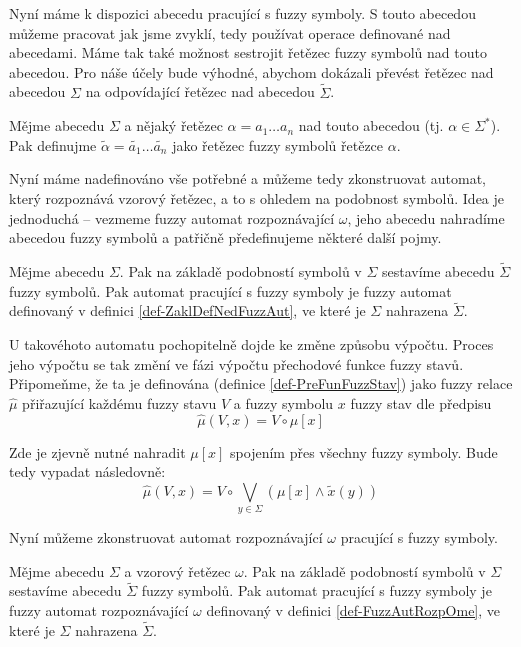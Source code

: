 \documentclass[a4paper,10pt]{article}
\begin{document}
Nyní máme k dispozici abecedu pracující s fuzzy symboly. S touto abecedou můžeme pracovat jak jsme zvyklí, tedy používat operace definované nad abecedami. Máme tak také možnost sestrojit řetězec fuzzy symbolů nad touto abecedou. Pro náše účely bude výhodné, abychom dokázali převést řetězec nad abecedou $\Sigma$ na odpovídající řetězec nad abecedou $\widetilde{\Sigma}$.

\begin{definition}
Mějme abecedu $\Sigma$ a nějaký řetězec $\alpha = a_1 \dots a_n$ nad touto abecedou (tj. $\alpha \in \Sigma^*$). Pak definujme $\widetilde{\alpha} = \widetilde{a_1} \dots \widetilde{a_n}$ jako řetězec fuzzy symbolů řetězce $\alpha$.
\end{definition}

Nyní máme nadefinováno vše potřebné a můžeme tedy zkonstruovat automat, který rozpoznává vzorový řetězec, a to s ohledem na podobnost symbolů. Idea je jednoduchá -- vezmeme fuzzy automat rozpoznávající $\omega$, jeho abecedu nahradíme abecedou fuzzy symbolů a patřičně předefinujeme některé další pojmy.

\begin{definition}
  Mějme abecedu $\Sigma$. Pak na základě podobností symbolů v $\Sigma$ sestavíme abecedu $\widetilde{\Sigma}$ fuzzy symbolů. Pak automat pracující s fuzzy symboly je fuzzy automat definovaný v definici \ref{def-ZaklDefNedFuzzAut}, ve které je $\Sigma$ nahrazena $\widetilde{\Sigma}$.
\end{definition}

U takovéhoto automatu pochopitelně dojde ke změne způsobu výpočtu. Proces jeho výpočtu se tak změní ve fázi výpočtu přechodové funkce fuzzy stavů. Připomeňme, že ta je definována (definice \ref{def-PreFunFuzzStav}) jako fuzzy relace $\widehat{\mu}$ přiřazující každému fuzzy stavu $V$ a fuzzy symbolu $x$ fuzzy stav dle předpisu
$$
 \widehat{\mu}(V, x) = V \circ \mu[x]
$$

Zde je zjevně nutné nahradit $\mu[x]$ spojením přes všechny fuzzy symboly. Bude tedy vypadat následovně:
$$
 \widehat{\mu}(V, x) = V \circ \bigvee_{y \in \Sigma} (\mu[x] \wedge \widetilde{x}(y))
$$

Nyní můžeme zkonstruovat automat rozpoznávající $\omega$ pracující s fuzzy symboly.
\begin{definition}
  Mějme abecedu $\Sigma$ a vzorový řetězec $\omega$. Pak na základě podobností symbolů v $\Sigma$ sestavíme abecedu $\widetilde{\Sigma}$ fuzzy symbolů. Pak automat pracující s fuzzy symboly je fuzzy automat rozpoznávající $\omega$ definovaný v definici \ref{def-FuzzAutRozpOme}, ve které je $\Sigma$ nahrazena $\widetilde{\Sigma}$.
\end{definition}
\end{document}
